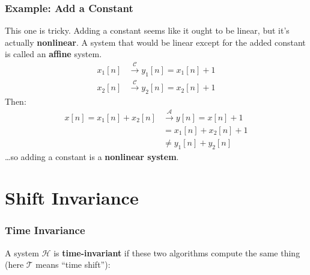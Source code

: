 \documentclass{beamer}
\begin{document}
\begin{frame}
  \frametitle{Example: Add a Constant}

  This one is tricky.  Adding a constant seems like it ought to be
  linear, but it's actually {\bf nonlinear}.  A system that would be
  linear except for the added constant is called an {\bf affine}
  system.
  \begin{align*}
  x_1[n] &\stackrel{\mathcal C}{\longrightarrow} y_1[n]=x_1[n]+1\\
  x_2[n] &\stackrel{\mathcal C}{\longrightarrow} y_2[n]=x_2[n]+1
  \end{align*}
  Then:
  \begin{align*}
    x[n]=x_1[n]+x_2[n] &\stackrel{\mathcal A}{\longrightarrow} y[n]=x[n]+1\\
    &= x_1[n]+x_2[n]+1\\
    &\ne y_1[n]+y_2[n]
  \end{align*}
  \ldots so adding a constant is a {\bf nonlinear system}.
\end{frame}


\section[Shift Invariance]{Shift Invariance}
\setcounter{subsection}{1}

\begin{frame}
  \frametitle{Time Invariance}

  A system ${\mathcal H}$ is {\bf time-invariant} if these two
  algorithms compute the same thing (here ${\mathcal T}$ means ``time
  shift''):
  
  \begin{center}
  \end{center}
  \begin{center}
  \end{center}
\end{frame}
\end{document}

